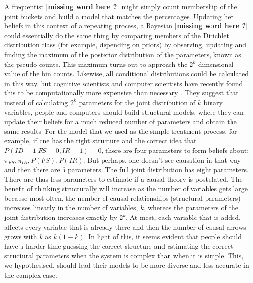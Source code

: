 A frequentist {\bf [missing word here ?]} might simply count membership of the joint buckets and build a model that matches the percentages. Updating her beliefs in this context of a repeating process, a Bayesian  {\bf [missing word here ?]}  could essentially do the same thing by comparing members of the Dirichlet distribution class (for example, depending on priors) by observing, updating and finding the maximum of the posterior distribution of the parameters, known as the pseudo counts. This maximum turns out to approach the $2^k$ dimensional value of the bin counts. Likewise, all conditional distributions could be calculated in this way, but cognitive scientists and computer scientists have recently found this to be computationally more expensive than necessary \citep{Griffith08, Koller03}.  They suggest that instead of calculating $2^k$ parameters for the joint distribution of $k$ binary variables, people and computers should build structural models, where they can update their beliefs for a much reduced number of parameters and obtain the same results. For the model that we used as the simple treatment process, for example, if one has the right structure and the correct idea that $P(ID=1|FS=0, IR=1)=0$, there are four parameters to form beliefs about: $\pi_{FS}, \pi_{IR}, P(FS), P(IR)$. But perhaps, one doesn't see causation in that way and then there are $5$ parameters.  The full joint distribution has eight parameters.  There are thus less parameters to estimate if a causal theory is postulated. The benefit of thinking structurally will increase as the number of variables gets large because most often, the number of causal relationships (structural parameters) increases linearly in the number of variables, $k$, whereas the parameters of the joint distribution increases exactly by $2^k$.  At most, each variable that is added, affects every variable that is already there and then the number of causal arrows grows with $k$ as $k(1-k)$. In light of this, it seems evident that people should have a harder time guessing the correct structure and estimating the correct structural parameters when the system is complex than when it is simple. This, we hypothesised, should lead their models to be more diverse and less accurate in the complex case. 



